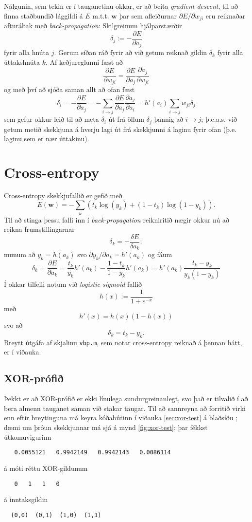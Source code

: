 \documentclass[a4paper,icelandic]{article}
\begin{document}
Nálgunin, sem tekin er í tauganetinu okkar, er að beita \emph{gradient
descent}, til að finna staðbundið lággildi á $E$ m.t.t. $\mathbf w$ þar
sem afleiðurnar $\partial E/\partial w_{ji}$ eru reiknaðar afturábak með
\emph{back-propagation}: Skilgreinum hjálparstærðir 
\[
\delta_j :=  -\frac{\partial E}{\partial a_j}
\]
fyrir alla hnúta $j$. Gerum síðan ráð fyrir
að við getum reiknað gildin $\delta_k$ fyrir alla úttakshnúta $k$.
Af keðjureglunni fæst að 
\[
\frac{\partial E}{\partial w_{ji}}
= \frac{\partial E}{\partial a_j}\frac{\partial a_j}{\partial w_{ji}}
\]
og með því að sjóða saman allt að ofan fæst
\[
\delta_i
= - \frac{\partial E}{\partial a_j}
= - \sum_{i\to j} \frac{\partial E}{\partial a_j} \frac{\partial a_j}{\partial a_i}
= h'(a_i) \sum_{i\to j} w_{ji}\delta_j
\]
sem gefur okkur leið til að meta $\delta_i$ út frá öllum $\delta_j$ þannig að
$i\to j$; þ.e.a.s. við getum metið skekkjuna á hverju lagi út frá
skekkjunni á laginu fyrir ofan (þ.e. laginu sem er nær úttakinu).


\section{Cross-entropy}

Cross-entropy skekkjufallið er gefið með 
\[
E(\mathbf w) 
= - \sum_k (t_k \log(y_k) + (1-t_k) \log(1-y_k)).
\]
Til að stinga þessu falli inn í \emph{back-propagation} reikniritið
nægir okkur nú að reikna frumstillingarnar
\[
\delta_k
= -\frac{\delta E}{\delta a_k};
\]
munum að $y_k = h(a_k)$ svo $\partial y_k / \partial a_k = h'(a_k)$ og
fáum 
\[
\delta_k
= \frac{\partial E}{\partial a_k}
= \frac{t_k}{y_k}h'(a_k)
- \frac{1-t_k}{1-y_k}h'(a_k)
= h'(a_k)\frac{t_k - y_k}{y_k(1-y_k)}
\]
Í okkar tilfelli notum við \emph{logistic sigmoid} fallið
\[
h(x) := \frac{1}{1+e^{-x}}
\]
með 
\[
h'(x) = h(x)(1-h(x))
\]
svo að 
\[
\delta_k 
= t_k - y_k.
\]
Breytt útgáfa af skjalinu \texttt{vbp.m}, sem notar cross-entropy
reiknað á þennan hátt, er í viðauka.


\subsection{XOR-prófið}

Þekkt er að XOR-prófið er ekki línulega sundurgreinanlegt, svo það er
tilvalið í að bera almenn tauganet saman við stakar taugar. Til að
sannreyna að forritið virki enn eftir breytinguna má keyra kóðabútinn
í viðauka \ref{sec:xor-test} á blaðsíðu \pageref{sec:xor-test}; dæmi um
þróun skekkjunnar má sjá á mynd \ref{fig:xor-test}; þar fékkst
útkomuvigurinn 
\begin{verbatim}
   0.0055121   0.9942149   0.9942143   0.0086114
\end{verbatim}
á móti réttu XOR-gildunum
\begin{verbatim}
   0   1   1   0
\end{verbatim}
á inntaksgildin
\begin{verbatim}
  (0,0)  (0,1)  (1,0)  (1,1)
\end{verbatim}
\end{document}
